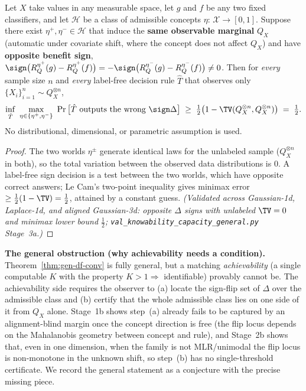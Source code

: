 \begin{theorem}\label{thm:gen-df-conv}
Let $X$ take values in any measurable space, let $g$ and $f$ be any two fixed
classifiers, and let $\mathcal H$ be a class of admissible concepts $\eta:\,
\mathcal X\to[0,1]$. Suppose there exist $\eta^+,\eta^-\in\mathcal H$ that induce the
\textbf{same observable marginal} $Q_X$ (automatic under covariate shift, where the
concept does not affect $Q_X$) and have \textbf{opposite benefit sign},
$\sign\big(R_Q^{\eta^+}(g)-R_Q^{\eta^+}(f)\big)=-\sign\big(R_Q^{\eta^-}(g)-R_Q^{\eta^-}(f)\big)\neq0$.
Then for \emph{every} sample size $n$ and \emph{every} label-free decision rule
$\hat T$ that observes only $\{X_i\}_{i=1}^n\sim Q_X^{\otimes n}$,
\[
  \inf_{\hat T}\ \max_{\eta\in\{\eta^+,\eta^-\}}\ \Pr\big[\hat T\ \text{outputs the wrong }\sign\Delta\big]
  \;\ge\;\tfrac12\big(1-\TV(Q_X^{\otimes n},Q_X^{\otimes n})\big)\;=\;\tfrac12 .
\]
No distributional, dimensional, or parametric assumption is used.
\end{theorem}
\begin{proof}
The two worlds $\eta^\pm$ generate identical laws for the unlabeled sample
($Q_X^{\otimes n}$ in both), so the total variation between the observed data
distributions is $0$. A label-free sign decision is a test between the two worlds,
which have opposite correct answers; Le Cam's two-point inequality gives minimax error
$\ge\tfrac12(1-\TV)=\tfrac12$, attained by a constant guess.
\emph{(Validated across Gaussian-1d, Laplace-1d, and aligned Gaussian-3d: opposite
$\Delta$ signs with unlabeled $\TV=0$ and minimax lower bound $\tfrac12$;
\texttt{val\_knowability\_capacity\_general.py} Stage~3a.)}
\end{proof}

\noindent\textbf{The general obstruction (why achievability needs a condition).}
Theorem~\ref{thm:gen-df-conv} is fully general, but a matching \emph{achievability}
(a single computable $K$ with the property $K>1\Rightarrow$ identifiable) provably
cannot be. The achievability side requires the observer to (a) locate the
sign-flip set of $\Delta$ over the admissible class and (b) certify that the whole
admissible class lies on one side of it from $Q_X$ alone. Stage~1b shows step~(a)
already fails to be captured by an alignment-blind margin once the concept direction is
free (the flip locus depends on the Mahalanobis geometry between concept and rule), and
Stage~2b shows that, even in one dimension, when the family is not MLR/unimodal the
flip locus is non-monotone in the unknown shift, so step~(b) has no single-threshold
certificate. We record the general statement as a conjecture with the precise missing
piece.

